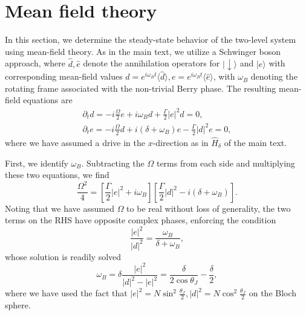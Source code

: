 \documentclass[11pt]{article}
\begin{document}
\section{Mean field theory}
\label{sec:MFT}

In this section, we determine the steady-state behavior of the two-level system using mean-field theory. As in the main text, we utilize a Schwinger boson approach, where $\hat d, \hat e$ denote the annihilation operators for $|{\downarrow}\rangle$ and $|e\rangle$ with corresponding mean-field values $d = e^{i \omega_Bt} \langle \hat d \rangle, e = e^{i \omega_Bt}  \langle \hat e \rangle$, with $\omega_B$ denoting the rotating frame associated with the non-trivial Berry phase. The resulting mean-field equations are
\begin{subequations}
    \begin{gather}
    \label{eq:MFTg}
        \partial_t d = - i \frac{\Omega}{2} e + i \omega_B d + \frac{\Gamma}{2} |e|^2 d = 0,\\
    \label{eq:MFTe}
        \partial_t e = - i \frac{\Omega}{2} d + i (\delta + \omega_B) e - \frac{\Gamma}{2} |d|^2 e = 0,
    \end{gather}
\end{subequations}
where we have assumed a drive in the $x$-direction as in $\hat H_\delta$ of the main text.

First, we identify $\omega_B$. Subtracting the $\Omega$ terms from each side and multiplying these two equations, we find
\begin{equation}
    \frac{\Omega^2}{4} = \left[ \frac{\Gamma}{2} |e|^2 + i \omega_B\right] \left[ \frac{\Gamma}{2} |d|^2 - i (\delta + \omega_B) \right].
\end{equation}
Noting that we have assumed $\Omega$ to be real without loss of generality, the two terms on the RHS have opposite complex phases, enforcing the condition
\begin{equation}
    \frac{|e|^2}{|d|^2} = \frac{\omega_B}{\delta + \omega_B},
\end{equation}
whose solution is readily solved
\begin{equation}
    \omega_B= \delta \frac{|e|^2}{|d|^2-|e|^2} = \frac{\delta}{2 \cos \theta_J} - \frac{\delta}{2},
\end{equation}
where we have used the fact that $|e|^2 = N \sin^2\frac{\theta_J}{2}, |d|^2 = N \cos^2 \frac{\theta_J}{2}$ on the Bloch sphere.
\end{document}
